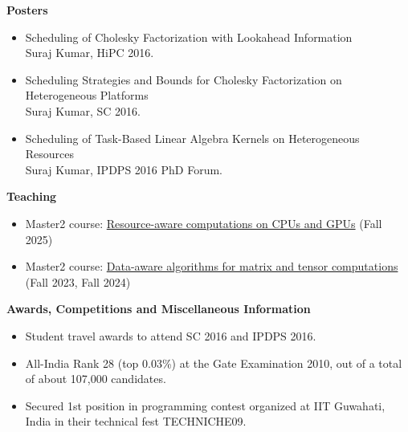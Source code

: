 \documentclass[letterpaper,11pt]{article}
\newcommand{\resheading}[1]{{\large \colorbox{mygrey}{\begin{minipage}{\textwidth}{\textbf{#1 \vphantom{p\^{E}}}}\end{minipage}}}}
\begin{document}
\vspace*{0.2in}

\resheading{Posters}
\begin{itemize}
	\item Scheduling of Cholesky Factorization with Lookahead Information\\
	Suraj Kumar, HiPC 2016.
	\item Scheduling Strategies and Bounds for Cholesky Factorization on Heterogeneous Platforms\\
	Suraj Kumar, SC 2016.
	\item Scheduling of Task-Based Linear Algebra Kernels on Heterogeneous Resources\\
	Suraj Kumar, IPDPS 2016 PhD Forum.
\end{itemize}
\vspace{0.1in}
\resheading{Teaching}
\begin{itemize}
	\item Master2 course: \href{https://suraj.gitlabpages.inria.fr/rac/home.html}{Resource-aware computations on CPUs and GPUs} (Fall 2025)
	\item Master2 course: \href{https://surakuma.github.io/courses/daamtc.html}{Data-aware algorithms for matrix and tensor computations} (Fall 2023, Fall 2024)
\end{itemize}

\vspace{0.1in}

\resheading{Awards, Competitions and Miscellaneous Information}
\begin{itemize}
	\item Student travel awards to attend SC 2016 and IPDPS 2016.
	\item {All-India Rank 28 (top 0.03\%) at the Gate Examination 2010, out of a total of about 107,000 candidates.}
	\item {Secured 1st position in programming contest organized at IIT Guwahati, India in their technical fest TECHNICHE09.}

\end{itemize}
\end{document}
